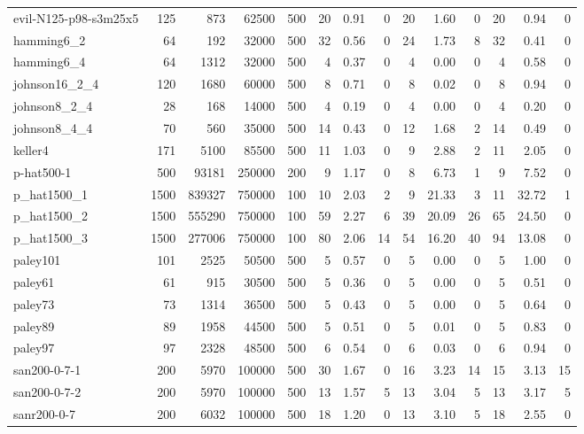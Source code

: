 \begin{tabular}{lrrrrrrrrrrrrr}
evil-N125-p98-s3m25x5 & 125 & 873 & 62500 & 500 & 20 & 0.91 & 0 & 20 & 1.60 & 0 & 20 & 0.94 & 0 \\
hamming6\_2 & 64 & 192 & 32000 & 500 & 32 & 0.56 & 0 & 24 & 1.73 & 8 & 32 & 0.41 & 0 \\
hamming6\_4 & 64 & 1312 & 32000 & 500 & 4 & 0.37 & 0 & 4 & 0.00 & 0 & 4 & 0.58 & 0 \\
johnson16\_2\_4 & 120 & 1680 & 60000 & 500 & 8 & 0.71 & 0 & 8 & 0.02 & 0 & 8 & 0.94 & 0 \\
johnson8\_2\_4 & 28 & 168 & 14000 & 500 & 4 & 0.19 & 0 & 4 & 0.00 & 0 & 4 & 0.20 & 0 \\
johnson8\_4\_4 & 70 & 560 & 35000 & 500 & 14 & 0.43 & 0 & 12 & 1.68 & 2 & 14 & 0.49 & 0 \\
keller4 & 171 & 5100 & 85500 & 500 & 11 & 1.03 & 0 & 9 & 2.88 & 2 & 11 & 2.05 & 0 \\
p-hat500-1 & 500 & 93181 & 250000 & 200 & 9 & 1.17 & 0 & 8 & 6.73 & 1 & 9 & 7.52 & 0 \\
p\_hat1500\_1 & 1500 & 839327 & 750000 & 100 & 10 & 2.03 & 2 & 9 & 21.33 & 3 & 11 & 32.72 & 1 \\
p\_hat1500\_2 & 1500 & 555290 & 750000 & 100 & 59 & 2.27 & 6 & 39 & 20.09 & 26 & 65 & 24.50 & 0 \\
p\_hat1500\_3 & 1500 & 277006 & 750000 & 100 & 80 & 2.06 & 14 & 54 & 16.20 & 40 & 94 & 13.08 & 0 \\
paley101 & 101 & 2525 & 50500 & 500 & 5 & 0.57 & 0 & 5 & 0.00 & 0 & 5 & 1.00 & 0 \\
paley61 & 61 & 915 & 30500 & 500 & 5 & 0.36 & 0 & 5 & 0.00 & 0 & 5 & 0.51 & 0 \\
paley73 & 73 & 1314 & 36500 & 500 & 5 & 0.43 & 0 & 5 & 0.00 & 0 & 5 & 0.64 & 0 \\
paley89 & 89 & 1958 & 44500 & 500 & 5 & 0.51 & 0 & 5 & 0.01 & 0 & 5 & 0.83 & 0 \\
paley97 & 97 & 2328 & 48500 & 500 & 6 & 0.54 & 0 & 6 & 0.03 & 0 & 6 & 0.94 & 0 \\
san200-0-7-1 & 200 & 5970 & 100000 & 500 & 30 & 1.67 & 0 & 16 & 3.23 & 14 & 15 & 3.13 & 15 \\
san200-0-7-2 & 200 & 5970 & 100000 & 500 & 13 & 1.57 & 5 & 13 & 3.04 & 5 & 13 & 3.17 & 5 \\
sanr200-0-7 & 200 & 6032 & 100000 & 500 & 18 & 1.20 & 0 & 13 & 3.10 & 5 & 18 & 2.55 & 0 \\
\bottomrule
\end{tabular}
